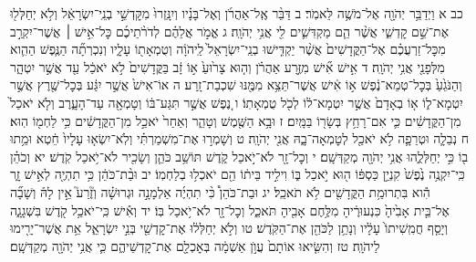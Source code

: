 \documentclass[twoside, openany, parskip=half, 11pt]{book}
\begin{document}
כב א וַיְדַבֵּ֥ר יְהֹוָ֖ה אֶל־מֹשֶׁ֥ה לֵּאמֹֽר׃ ב דַּבֵּ֨ר אֶֽל־אַהֲרֹ֜ן וְאֶל־בָּנָ֗יו וְיִנָּֽזְרוּ֙ מִקׇּדְשֵׁ֣י בְנֵֽי־יִשְׂרָאֵ֔ל וְלֹ֥א יְחַלְּל֖וּ אֶת־שֵׁ֣ם קׇדְשִׁ֑י אֲשֶׁ֨ר הֵ֧ם מַקְדִּשִׁ֛ים לִ֖י אֲנִ֥י יְהֹוָֽה׃ ג אֱמֹ֣ר אֲלֵהֶ֗ם לְדֹרֹ֨תֵיכֶ֜ם כׇּל־אִ֣ישׁ ׀ אֲשֶׁר־יִקְרַ֣ב מִכׇּל־זַרְעֲכֶ֗ם אֶל־הַקֳּדָשִׁים֙ אֲשֶׁ֨ר יַקְדִּ֤ישׁוּ בְנֵֽי־יִשְׂרָאֵל֙ לַֽיהֹוָ֔ה וְטֻמְאָת֖וֹ עָלָ֑יו וְנִכְרְתָ֞ה הַנֶּ֧פֶשׁ הַהִ֛וא מִלְּפָנַ֖י אֲנִ֥י יְהֹוָֽה׃ ד אִ֣ישׁ אִ֞ישׁ מִזֶּ֣רַע אַהֲרֹ֗ן וְה֤וּא צָר֙וּעַ֙ א֣וֹ זָ֔ב בַּקֳּדָשִׁים֙ לֹ֣א יֹאכַ֔ל עַ֖ד אֲשֶׁ֣ר יִטְהָ֑ר וְהַנֹּגֵ֙עַ֙ בְּכׇל־טְמֵא־נֶ֔פֶשׁ א֣וֹ אִ֔ישׁ אֲשֶׁר־תֵּצֵ֥א מִמֶּ֖נּוּ שִׁכְבַת־זָֽרַע׃ ה אוֹ־אִישׁ֙ אֲשֶׁ֣ר יִגַּ֔ע בְּכׇל־שֶׁ֖רֶץ אֲשֶׁ֣ר יִטְמָא־ל֑וֹ א֤וֹ בְאָדָם֙ אֲשֶׁ֣ר יִטְמָא־ל֔וֹ לְכֹ֖ל טֻמְאָתֽוֹ׃ ו נֶ֚פֶשׁ אֲשֶׁ֣ר תִּגַּע־בּ֔וֹ וְטָמְאָ֖ה עַד־הָעָ֑רֶב וְלֹ֤א יֹאכַל֙ מִן־הַקֳּדָשִׁ֔ים כִּ֛י אִם־רָחַ֥ץ בְּשָׂר֖וֹ בַּמָּֽיִם׃ ז וּבָ֥א הַשֶּׁ֖מֶשׁ וְטָהֵ֑ר וְאַחַר֙ יֹאכַ֣ל מִן־הַקֳּדָשִׁ֔ים כִּ֥י לַחְמ֖וֹ הֽוּא׃ ח נְבֵלָ֧ה וּטְרֵפָ֛ה לֹ֥א יֹאכַ֖ל לְטׇמְאָה־בָ֑הּ אֲנִ֖י יְהֹוָֽה׃ ט וְשָׁמְר֣וּ אֶת־מִשְׁמַרְתִּ֗י וְלֹֽא־יִשְׂא֤וּ עָלָיו֙ חֵ֔טְא וּמֵ֥תוּ ב֖וֹ כִּ֣י יְחַלְּלֻ֑הוּ אֲנִ֥י יְהֹוָ֖ה מְקַדְּשָֽׁם׃ י וְכׇל־זָ֖ר לֹא־יֹ֣אכַל קֹ֑דֶשׁ תּוֹשַׁ֥ב כֹּהֵ֛ן וְשָׂכִ֖יר לֹא־יֹ֥אכַל קֹֽדֶשׁ׃ יא וְכֹהֵ֗ן כִּֽי־יִקְנֶ֥ה נֶ֙פֶשׁ֙ קִנְיַ֣ן כַּסְפּ֔וֹ ה֖וּא יֹ֣אכַל בּ֑וֹ וִילִ֣יד בֵּית֔וֹ הֵ֖ם יֹאכְל֥וּ בְלַחְמֽוֹ׃ יב וּבַ֨ת־כֹּהֵ֔ן כִּ֥י תִהְיֶ֖ה לְאִ֣ישׁ זָ֑ר הִ֕וא בִּתְרוּמַ֥ת הַקֳּדָשִׁ֖ים לֹ֥א תֹאכֵֽל׃ יג וּבַת־כֹּהֵן֩ כִּ֨י תִהְיֶ֜ה אַלְמָנָ֣ה וּגְרוּשָׁ֗ה וְזֶ֘רַע֮ אֵ֣ין לָהּ֒ וְשָׁבָ֞ה אֶל־בֵּ֤ית אָבִ֙יהָ֙ כִּנְעוּרֶ֔יהָ מִלֶּ֥חֶם אָבִ֖יהָ תֹּאכֵ֑ל וְכׇל־זָ֖ר לֹא־יֹ֥אכַל בּֽוֹ׃ יד וְאִ֕ישׁ כִּֽי־יֹאכַ֥ל קֹ֖דֶשׁ בִּשְׁגָגָ֑ה וְיָסַ֤ף חֲמִֽשִׁיתוֹ֙ עָלָ֔יו וְנָתַ֥ן לַכֹּהֵ֖ן אֶת־הַקֹּֽדֶשׁ׃ טו וְלֹ֣א יְחַלְּל֔וּ אֶת־קׇדְשֵׁ֖י בְּנֵ֣י יִשְׂרָאֵ֑ל אֵ֥ת אֲשֶׁר־יָרִ֖ימוּ לַיהֹוָֽה׃ טז וְהִשִּׂ֤יאוּ אוֹתָם֙ עֲוֺ֣ן אַשְׁמָ֔ה בְּאׇכְלָ֖ם אֶת־קׇדְשֵׁיהֶ֑ם כִּ֛י אֲנִ֥י יְהֹוָ֖ה מְקַדְּשָֽׁם׃
\end{document}
